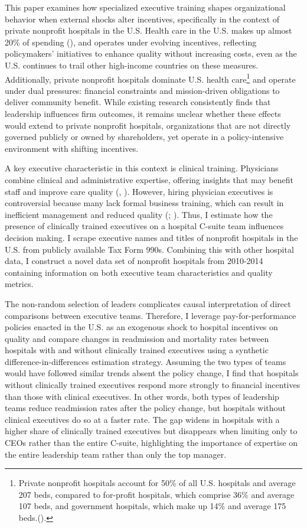 \documentclass[12pt]{article}
\begin{document}
    This paper examines how specialized executive training shapes organizational behavior when external shocks alter incentives, specifically in the context of private nonprofit hospitals in the U.S. Health care in the U.S. makes up almost 20\% of spending (\cite{CMSNationalHealthExpenditure}), and operates under evolving incentives, reflecting policymakers’ initiatives to enhance quality without increasing costs, even as the U.S. continues to trail other high-income countries on these measures. Additionally, private nonprofit hospitals dominate U.S. health care\footnote{Private nonprofit hospitals account for 50\% of all U.S. hospitals and average 207 beds, compared to for-profit hospitals, which comprise 36\% and average 107 beds, and government hospitals, which make up 14\% and average 175 beds.(\cite{ASPE_2023}).} and operate under dual pressures: financial constraints and mission-driven obligations to deliver community benefit. While existing research consistently finds that leadership influences firm outcomes, it remains unclear whether these effects would extend to private nonprofit hospitals, organizations that are not directly governed publicly or owned by shareholders, yet operate in a policy-intensive environment with shifting incentives.
    
    A key executive characteristic in this context is clinical training. Physicians combine clinical and administrative expertise, offering insights that may benefit staff and improve care quality (\cite{Stajduhar_2023}, \cite{Ahmed_2022}). However, hiring physician executives is controversial because many lack formal business training, which can result in inefficient management and reduced quality (\cite{HarvardBusinessReview2018}; \cite{munoz2025managers}). Thus, I estimate how the presence of clinically trained executives on a hospital C-suite team influences decision making. I scrape executive names and titles of nonprofit hospitals in the U.S. from publicly available Tax Form 990s. Combining this with other hospital data, I construct a novel data set of nonprofit hospitals from 2010-2014 containing information on both executive team characteristics and quality metrics.
    
    The non-random selection of leaders complicates causal interpretation of direct comparisons between executive teams. Therefore, I leverage pay-for-performance policies enacted in the U.S. as an exogenous shock to hospital incentives on quality and compare changes in readmission and mortality rates between hospitals with and without clinically trained executives using a synthetic difference-in-differences estimation strategy. Assuming the two types of teams would have followed similar trends absent the policy change, I find that hospitals without clinically trained executives respond more strongly to financial incentives than those with clinical executives. In other words, both types of leadership teams reduce readmission rates after the policy change, but hospitals without clinical executives do so at a faster rate. The gap widens in hospitals with a higher share of clinically trained executives but disappears when limiting only to CEOs rather than the entire C-suite, highlighting the importance of expertise on the entire leadership team rather than only the top manager.
\end{document}
